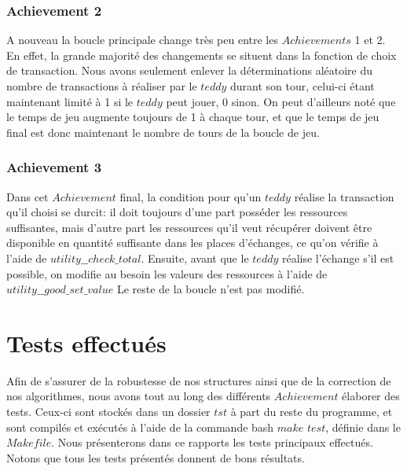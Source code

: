 \documentclass{article}
\begin{document}
\subsubsection{Achievement 2}
A nouveau la boucle principale change très peu entre les $Achievements$ 1 et 2. En effet, la grande majorité des changements se situent dans la fonction de choix de transaction. Nous avons seulement enlever la déterminations aléatoire du nombre de transactions à réaliser par le $teddy$ durant son tour, celui-ci étant maintenant limité à 1 si le $teddy$ peut jouer, 0 sinon. On peut d'ailleurs noté que le temps de jeu augmente toujours de 1 à chaque tour, et que le temps de jeu final est donc maintenant le nombre de tours de la boucle de jeu. 

\subsubsection{Achievement 3}
Dans cet $Achievement$ final, la condition pour qu'un $teddy$ réalise la transaction qu'il choisi se durcit: il doit toujours d'une part posséder les ressources suffisantes, mais d'autre part les ressources qu'il veut récupérer doivent être disponible en quantité suffisante dans les places d'échanges, ce qu'on vérifie à l'aide de $utility\_\_check\_total$. Ensuite, avant que le $teddy$ réalise l'échange s'il est possible, on modifie au besoin les valeurs des ressources à l'aide de $utility\_\_good\_set\_value$ Le reste de la boucle n'est pas modifié. 


\section {Tests effectués}
Afin de s'assurer de la robustesse de nos structures ainsi que de la correction de nos algorithmes, nous avons tout au long des différents $Achievement$ élaborer des tests. Ceux-ci sont stockés dans un dossier $tst$ à part du reste du programme, et sont compilés et exécutés à l'aide de la commande bash $make$ $test$, définie dans le $Makefile$. Nous présenterons dans ce rapports les tests principaux effectués. Notons que tous les tests présentés donnent de bons résultats.
\end{document}
